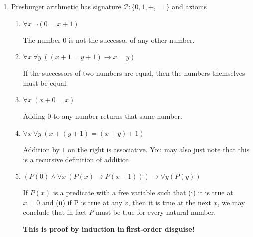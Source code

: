 \documentclass[11pt]{report}
\begin{document}
\begin{enumerate}
\begin{enumerate}
						\begin{mdframed}
							\begin{center}
								$\begin{array}{c}
									\infer[\forall I]{\forall x \ Fx}
										{\infer[DNE]{Fa}
											{\infer[\to I,1]{\lnot \lnot Fa}
												{\infer[MP]{\bot}
													{\lnot \exists x \ \lnot Fx
													&
													\infer[\exists I]{\exists x \ \lnot Fx}
														{\infer[1]{\cancel{\lnot Fa}}
															{}}}}}}
								\end{array}$
							\end{center}
						\end{mdframed}

		\end{enumerate}	
	
	\newpage
	\item Presburger arithmetic has signature $\mathcal{P}: \{0,1,+,=\}$ and axioms

		\begin{enumerate}
			\item $\forall x \ \lnot(0 = x + 1)$
			
			The number $0$ is not the successor of any other number. 

			\item $\forall x \ \forall y \ ((x + 1  = y + 1) \rightarrow x = y)$
			
			If the successors of two numbers are equal, then the numbers themselves must be equal. 

			\item $\forall x \ (x + 0 = x)$
			
			Adding $0$ to any number returns that same number. 

			\item $\forall x \ \forall y \ (x + (y + 1) = (x + y) + 1)$
			
			Addition by $1$ on the right is associative. You may also just note that this is a recursive definition of addition. 

			\item $(P(0) \land \forall x \ (P(x) \to P(x+1))) \rightarrow \forall y (P(y))$
			
			If $P(x)$ is a predicate with a free variable such that (i) it is true at $x=0$ and (ii) if P is true at any $x$, then it is true at the next $x$, we may conclude that in fact $P$ must be true for every natural number. 
			
			{\bf This is proof by induction in first-order disguise!}


\end{enumerate}
\end{enumerate}
\end{document}
